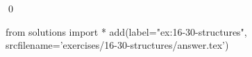 
\begin{ex}
  \label{ex:16-30-structures}
  
  \qed
\end{ex}
\begin{python0}
from solutions import *
add(label="ex:16-30-structures",
    srcfilename='exercises/16-30-structures/answer.tex')
\end{python0}
